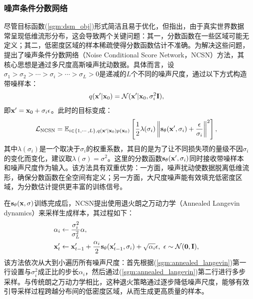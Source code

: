 \documentclass[11pt,a4paper,UTF8]{ctexart}
\begin{document}
\subsubsection{噪声条件分数网络}

尽管目标函数(\ref{sgm:dsm_obj})形式简洁且易于优化，但\cite{song2019generative}指出，由于真实世界数据常呈现低维流形分布，这会导致两个关键问题：其一，分数函数在一些区域可能无定义；其二，低密度区域的样本稀疏使得分数函数估计不准确。为解决这些问题，\cite{song2019generative}提出了噪声条件分数网络（Noise Conditional Score Network，NCSN）方法，其核心思想是通过多尺度高斯噪声扰动数据。具体而言，设$\sigma_1 > \sigma_2 > \cdots > \sigma_i > \cdots > \sigma_L > 0$是递减的$L$个不同的噪声尺度，通过以下方式构造带噪样本：
\begin{equation}
    q(\mathbf{x}^\prime|\mathbf{x}_0)=\mathcal{N}(\mathbf{x}^\prime|\mathbf{x}_0,\sigma_i^2\mathbf{I}),
\label{sgm:ncsn_forward}
\end{equation}
即$\mathbf{x}^\prime=\mathbf{x}_0+\sigma_i\epsilon$。此时的目标变成：
\begin{align}
\begin{split}
    \mathcal{L}_{\text{NCSN}}=\mathbb{E}_{i\in\{1,\cdots,L\},q(\mathbf{x}^\prime|\mathbf{x}_0)p(\mathbf{x}_0)} \left[\frac{1}{2} \lambda(\sigma_i)\left\| \mathbf{s}_\theta(\mathbf{x}^\prime,\sigma_i) + \frac{\epsilon}{\sigma_i} \right\|^2 \right],
\end{split}
\label{sgm:ncsn}
\end{align}
其中$\lambda(\sigma_i)$是一个取决于$\sigma_i$的权重系数，其目的是为了让不同损失项的量级不因$\sigma_i$的变化而变化，\cite{song2019generative}建议取$\lambda(\sigma)=\sigma^2$。这里的分数函数$\mathbf{s}_\theta(\mathbf{x}^\prime,\sigma_i)$同时接收带噪样本和噪声尺度作为输入。该方法具有双重优势：一方面，噪声扰动使数据脱离低维流形，确保分数函数在全空间有定义；另一方面，大尺度噪声能有效填充低密度区域，为分数估计提供更丰富的训练信号。

在$\mathbf{s}_\theta(\mathbf{x},\sigma)$训练完成后，NCSN提出使用退火朗之万动力学（Annealed Langevin dynamics）来采样生成样本，其过程如下：
\begin{align}
\begin{split}
\alpha_i &\leftarrow \frac{\sigma_i^2}{\sigma_L^2}\alpha, \\
\mathbf{x}^\prime_t & \leftarrow\mathbf{x}^\prime_{t-1} + \frac{\alpha_i}{2}\mathbf{s}_{\theta}(\mathbf{x}^\prime_{t-1},\sigma_i) + \sqrt{\alpha_i}\epsilon,\ \epsilon\sim\mathcal{N}(\mathbf{0},\mathbf{I}),
\end{split}
\label{sgm:annealed_langevin}
\end{align}
该方法依次从大到小遍历所有噪声尺度：首先根据(\ref{sgm:annealed_langevin})第一行设置与$\sigma_i^2$成正比的步长$\alpha_i$，然后通过(\ref{sgm:annealed_langevin})第二行进行多步采样。与传统朗之万动力学相比，这种退火策略通过逐步降低噪声尺度，能够有效引导采样过程跨越分布间的低密度区域，从而生成更高质量的样本\cite{song2019generative}。
\end{document}
